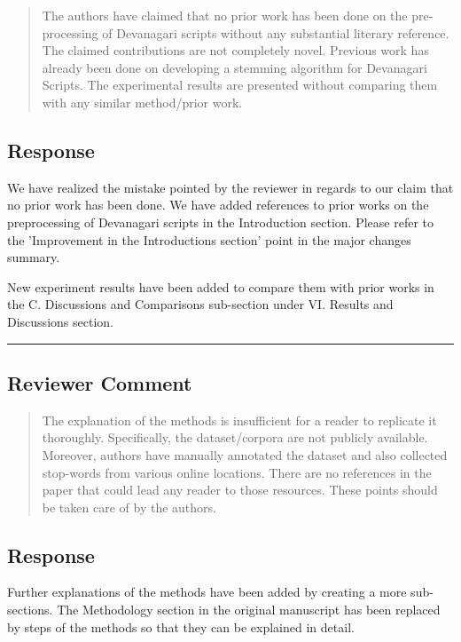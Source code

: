 \begin{mdframed}
\begin{quote}
The authors have claimed that no prior work has been done on the pre-processing
of Devanagari scripts without any substantial literary reference. The claimed
contributions are not completely novel. Previous work has already been done on
developing a stemming algorithm for Devanagari Scripts. The experimental results
are presented without comparing them with any similar method/prior work.
\end{quote}
\end{mdframed}

\subsection{Response} 
We have realized the mistake pointed by the reviewer in regards to our claim
that no prior work has been done. We have added references to prior works on the
preprocessing of Devanagari scripts in the Introduction section. Please refer to
the 'Improvement in the Introductions section' point in the major changes
summary.

New experiment results have been added to compare them with prior works in the
C. Discussions and Comparisons sub-section under VI. Results and Discussions
section.\\

\noindent\rule{17cm}{2.0pt}

\subsection{Reviewer Comment}

\begin{mdframed}
\begin{quote}
The explanation of the methods is insufficient for a reader to replicate it
thoroughly. Specifically, the dataset/corpora are not publicly available.
Moreover, authors have manually annotated the dataset and also collected
stop-words from various online locations. There are no references in the paper
that could lead any reader to those resources. These points should be taken care
of by the authors.
\end{quote}
\end{mdframed}

\subsection{Response} 
Further explanations of the methods have been added by creating a more
sub-sections. The Methodology section in the original manuscript has been
replaced by steps of the methods so that they can be explained in detail. 

